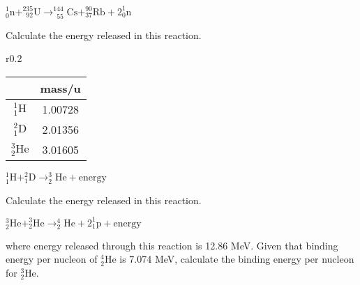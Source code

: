 
{
	
	\centering
	
	$^1_0\text{n} + ^{235}_{\phantom{2}92}\text{U} \longrightarrow ^{144}_{\phantom{1}55}\text{Cs} + ^{90}_{37}\text{Rb} + 2^1_0\text{n}$	
	
}

\noindent Calculate the energy released in this reaction.


\begin{wrapfigure}{r}{0.2\textwidth}
	\vspace*{-21pt}
	\flushright
	\begin{tabular}{|c|c|}
		\hline
		& mass/u \\ \hline
		$^1_1\text{H}$ & 1.00728 \\ \hline
		$^2_1\text{D}$ & 2.01356 \\ \hline 
		$^3_2\text{He}$ & 3.01605 \\ \hline
	\end{tabular}
	\vspace*{-10pt}
\end{wrapfigure}




{

\centering

$ ^1_1\text{H} + ^2_1\text{D} \longrightarrow ^3_2\text{He} + \text{energy}$

}
	
\noindent Calculate the energy released in this reaction.



\newpage




{
	
	\centering

	$^3_2\text{He} + ^3_2\text{He} \longrightarrow ^4_2\text{He} + 2 ^1_1\text{p} +\text{energy}$	
	
}

\noindent where energy released through this reaction is 12.86 MeV. Given that binding energy per nucleon of $^4_2\text{He}$ is 7.074 MeV, calculate the binding energy per nucleon for $^3_2\text{He}$.

